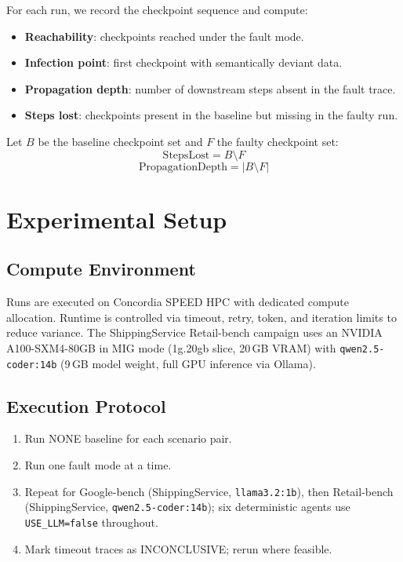 \documentclass[conference]{IEEEtran}
\begin{document}
For each run, we record the checkpoint sequence and compute:
\begin{itemize}
  \item \textbf{Reachability}: checkpoints reached under the fault mode.
  \item \textbf{Infection point}: first checkpoint with semantically deviant
        data.
  \item \textbf{Propagation depth}: number of downstream steps absent in the
        fault trace.
  \item \textbf{Steps lost}: checkpoints present in the baseline but missing
        in the faulty run.
\end{itemize}

Let $B$ be the baseline checkpoint set and $F$ the faulty checkpoint set:
\begin{equation}
  \mathrm{StepsLost} = B \setminus F
\end{equation}
\begin{equation}
  \mathrm{PropagationDepth} = \lvert B \setminus F \rvert
\end{equation}

\section{Experimental Setup}

\subsection{Compute Environment}
Runs are executed on Concordia SPEED HPC with dedicated compute allocation.
Runtime is controlled via timeout, retry, token, and iteration limits to reduce
variance. The ShippingService Retail-bench campaign uses an NVIDIA A100-SXM4-80GB
in MIG mode (1g.20gb slice, 20\,GB VRAM) with \texttt{qwen2.5-coder:14b} (9\,GB
model weight, full GPU inference via Ollama).

\subsection{Execution Protocol}
\begin{enumerate}
  \item Run NONE baseline for each scenario pair.
  \item Run one fault mode at a time.
  \item Repeat for Google-bench (ShippingService, \texttt{llama3.2:1b}),
        then Retail-bench (ShippingService, \texttt{qwen2.5-coder:14b}); six
        deterministic agents use \texttt{USE\_LLM=false} throughout.
  \item Mark timeout traces as INCONCLUSIVE; rerun where feasible.
\end{enumerate}
\end{document}
